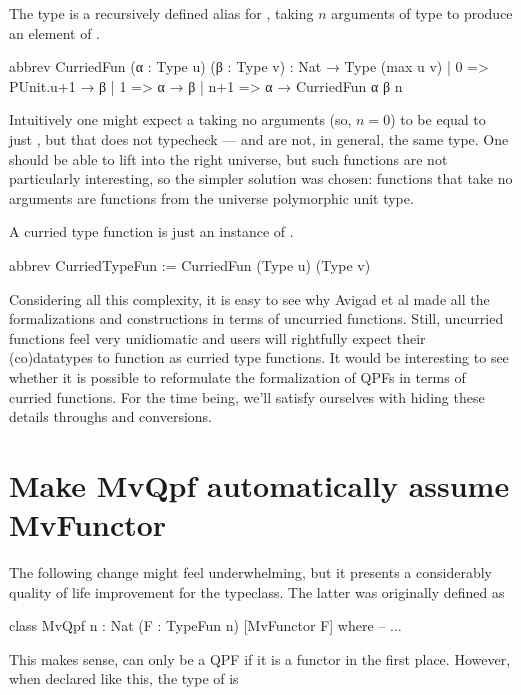 The type  is a recursively defined alias for , taking $n$ arguments of type  to produce an element of .
\begin{leancode}
    abbrev CurriedFun (α : Type u) (β : Type v) : Nat → Type (max u v)
      | 0   => PUnit.{u+1} → β
      | 1   => α → β
      | n+1 => α → CurriedFun α β n
\end{leancode}
Intuitively one might expect a  taking no arguments (so, $n = 0$) to be equal to  just , but that does not typecheck ---  and  are not, in general, the same type.
One should be able to lift  into the right universe, but such functions are not particularly interesting, so the simpler solution was chosen: functions that take no arguments are functions from the universe polymorphic unit type.

A curried type function is just an instance of .
\begin{leancode}
    abbrev CurriedTypeFun := CurriedFun (Type u) (Type v)
\end{leancode}



Considering all this complexity, it is easy to see why Avigad et al made all the formalizations and
constructions in terms of uncurried functions. 
Still, uncurried functions feel very unidiomatic and users will rightfully expect their (co)datatypes
to function as curried type functions. 
It would be interesting to see whether it is possible to reformulate the formalization of QPFs in
terms of curried functions. 
For the time being, we'll satisfy ourselves with hiding these details throughs
 and  conversions.



\section{Make MvQpf automatically assume MvFunctor}
The following change might feel underwhelming, but it presents a considerably quality 
of life improvement for the  typeclass. The latter was originally defined as
\begin{leancode}
    class MvQpf {n : Nat} (F : TypeFun n) [MvFunctor F] where
        -- ...
\end{leancode}
This makes sense,  can only be a QPF if it is a functor in the first place.
However, when declared like this, the type of  is 

